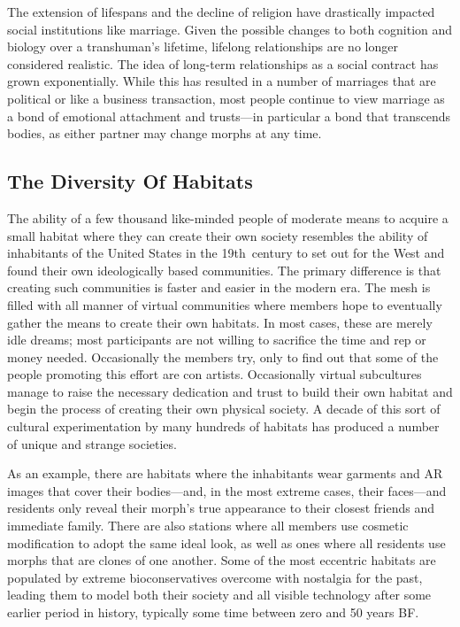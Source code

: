 The extension of lifespans and the decline of religion have drastically impacted social institutions like 
marriage. Given the possible changes to both cognition and biology over a transhuman's lifetime, lifelong 
relationships are no longer considered realistic. The 
idea of long-term relationships as a social contract 
has grown exponentially. While this has resulted in 
a number of marriages that are political or like a 
business transaction, most people continue to view 
marriage as a bond of emotional attachment and 
trusts—in particular a bond that transcends bodies, 
as either partner may change morphs at any time. 

\subsection{The Diversity Of Habitats}

The ability of a few thousand like-minded people of 
moderate means to acquire a small habitat where 
they can create their own society resembles the 
ability of inhabitants of the United States in the 
19th century to set out for the West and found their 
own ideologically based communities. The primary 
difference is that creating such communities is faster 
and easier in the modern era. The mesh is filled with 
all manner of virtual communities where members 
hope to eventually gather the means to create their 
own habitats. In most cases, these are merely idle 
dreams; most participants are not willing to sacrifice 
the time and rep or money needed. Occasionally the 
members try, only to find out that some of the people 
promoting this effort are con artists. Occasionally 
virtual subcultures manage to raise the necessary 
dedication and trust to build their own habitat and 
begin the process of creating their own physical society. A decade of this sort of cultural experimentation by many hundreds of habitats has produced a 
number of unique and strange societies.

As an example, there are habitats where the inhabitants wear garments and AR images that cover 
their bodies—and, in the most extreme cases, their 
faces—and residents only reveal their morph's true 
appearance to their closest friends and immediate 
family. There are also stations where all members use 
cosmetic modification to adopt the same ideal look, 
as well as ones where all residents use morphs that 
are clones of one another. Some of the most eccentric 
habitats are populated by extreme bioconservatives 
overcome with nostalgia for the past, leading them 
to model both their society and all visible technology 
after some earlier period in history, typically some 
time between zero and 50 years BF.

